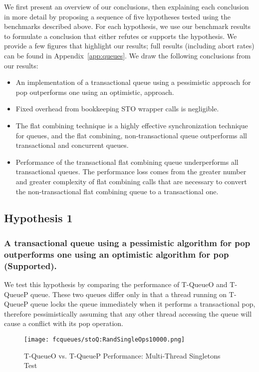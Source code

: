 We first present an overview of our conclusions, then explaining each conclusion in more detail by proposing a sequence of five hypotheses tested using the benchmarks described above. For each hypothesis, we use our benchmark results to formulate a conclusion that either refutes or supports the hypothesis.
We provide a few figures that highlight our results; full results (including abort rates) can be found in Appendix~\ref{app:queues}. We draw the following conclusions from our results:
\begin{itemize}
    \item An implementation of a transactional queue using a pessimistic approach for pop outperforms one using an optimistic, approach.
    \item Fixed overhead from bookkeeping STO wrapper calls is negligible.
    \item The flat combining technique is a highly effective synchronization technique for queues, and the flat combining, non-transactional queue outperforms all transactional and concurrent queues.
    \item Performance of the transactional flat combining queue underperforms all transactional queues. The performance loss comes from the greater number and greater complexity of flat combining calls that are necessary to convert the non-transactional flat combining queue to a transactional one.
\end{itemize}

\subsection[Hypothesis 1]{Hypothesis 1}
\subsubsection{A transactional queue using a pessimistic algorithm for pop outperforms one using an optimistic algorithm for pop (Supported).}

We test this hypothesis by comparing the performance of T-QueueO and T-QueueP queue. These two queues differ only in that a thread running on T-QueueP queue locks the queue immediately when it performs a transactional pop, therefore pessimistically assuming that any other thread accessing the queue will cause a conflict with its pop operation.

\begin{figure}[t!]
    \centering
	\begin{minipage}{\textwidth}
        {\texttt{[image: fcqueues/stoQ:RandSingleOps10000.png]}}
	\end{minipage}
    \caption{T-QueueO vs. T-QueueP Performance: Multi-Thread Singletons Test}
    \label{fig:stoqs}
\end{figure}

